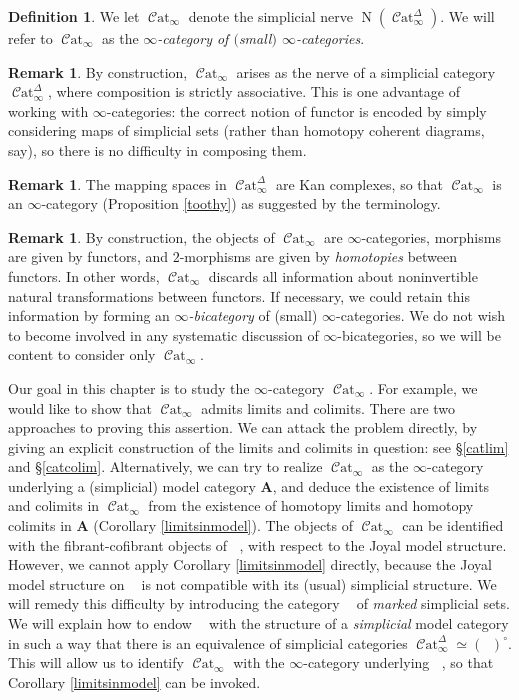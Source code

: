 \documentclass{report}[10pt, final]
\DeclareMathOperator{\Nerve}{N}
\newcommand{\bfA}{{\mathbf A}}
\newcommand{\degree}{\circ}
\DeclareMathOperator{\sSet}{\mathcal{S}et_{\Delta}}
\DeclareMathOperator{\mSet}{\mathcal{S}et_{\Delta}^{+}}
\DeclareMathOperator{\Cat}{\mathcal{C}at}
\theoremstyle{definition}
\newtheorem{definition}[theorem]{Definition}
\newtheorem{remark}[theorem]{Remark}
\begin{document}
\begin{Didn't Read}
\begin{definition}
We let $\Cat_{\infty}$ denote the simplicial nerve
$\Nerve(\Cat_{\infty}^{\Delta})$. We will refer to $\Cat_{\infty}$ as the {\it $\infty$-category
of $($small$)$ $\infty$-categories}.
\end{definition}

\begin{remark}
By construction, $\Cat_{\infty}$ arises as the nerve of a simplicial category
$\Cat_{\infty}^{\Delta}$, where composition is strictly associative. This is one advantage
of working with $\infty$-categories: the correct notion of functor is encoded by simply considering maps of simplicial sets (rather than homotopy coherent diagrams, say), so there is no difficulty in composing them.
\end{remark}

\begin{remark}
The mapping spaces in $\Cat^{\Delta}_{\infty}$ are Kan complexes, so that
$\Cat_{\infty}$ is an $\infty$-category (Proposition \ref{toothy}) as suggested by the terminology.
\end{remark}

\begin{remark}
By construction, the objects of $\Cat_{\infty}$ are $\infty$-categories, morphisms are given by functors, and $2$-morphisms are given by {\em homotopies} between functors. In other words, $\Cat_{\infty}$ discards all information about noninvertible natural transformations between functors. If necessary, we could retain this information by forming an {\it $\infty$-bicategory} of (small) $\infty$-categories. We do not wish to become involved in any systematic discussion of $\infty$-bicategories, so we will be content to consider only $\Cat_{\infty}$.
\end{remark}

Our goal in this chapter is to study the $\infty$-category $\Cat_{\infty}$. For example, we would like to show that $\Cat_{\infty}$ admits limits and colimits. There are two approaches to proving this assertion. We can attack the problem directly, by giving an explicit construction of the limits and colimits in question: see \S \ref{catlim} and \S \ref{catcolim}. Alternatively, we can try to
realize $\Cat_{\infty}$ as the $\infty$-category underlying a (simplicial) model category $\bfA$, and deduce the existence of limits and colimits in $\Cat_{\infty}$ from the existence of homotopy limits and homotopy colimits in $\bfA$ (Corollary \ref{limitsinmodel}). The objects of $\Cat_{\infty}$ can be identified with the fibrant-cofibrant objects of $\sSet$, with respect to the Joyal model structure. However, we cannot apply Corollary \ref{limitsinmodel} directly, because the Joyal model structure on $\sSet$ is not compatible with its (usual) simplicial structure. We will remedy this difficulty by introducing the category $\mSet$ of {\em marked} simplicial sets. We will explain how to endow $\mSet$ with the structure of a {\em simplicial} model category in such a way that there is an equivalence of simplicial categories $\Cat^{\Delta}_{\infty} \simeq (\mSet)^{\degree}$. This will allow us to identify $\Cat_{\infty}$ with the $\infty$-category underlying $\mSet$, so that Corollary \ref{limitsinmodel} can be invoked.


\end{Didn't Read}
\end{document}
